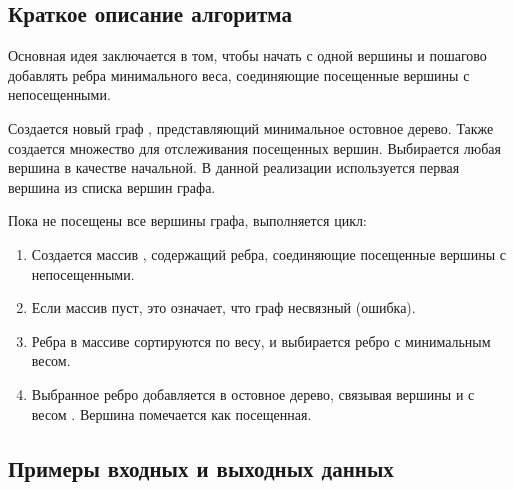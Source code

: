 \subsection{Краткое описание алгоритма}
Основная идея заключается в том, чтобы начать с одной вершины и пошагово добавлять ребра
минимального веса, соединяющие посещенные вершины с непосещенными.

Создается новый граф , представляющий минимальное остовное дерево.
Также создается множество  для отслеживания посещенных вершин.
Выбирается любая вершина в качестве начальной. В данной реализации используется
первая вершина из списка вершин графа.

Пока не посещены все вершины графа, выполняется цикл:
\begin{enumerate}
  \item Создается массив , содержащий ребра, соединяющие посещенные вершины с непосещенными.
  \item Если массив  пуст, это означает, что граф несвязный (ошибка).
  \item Ребра в массиве сортируются по весу, и выбирается ребро с минимальным весом.
  \item Выбранное ребро добавляется в остовное дерево, связывая вершины  и  с весом
  . Вершина  помечается как посещенная.
\end{enumerate}

\subsection{Примеры входных и выходных данных}
